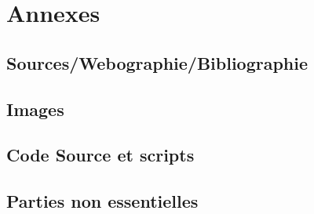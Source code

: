 \documentclass[a4paper,12pt,one side,titlepage]{report}
\begin{document}


\part{Annexes}
\chapter{Sources/Webographie/Bibliographie}

\chapter{Images}

\chapter{Code Source et scripts}

\chapter{Parties non essentielles}

%



\printglossaries
\end{document}

